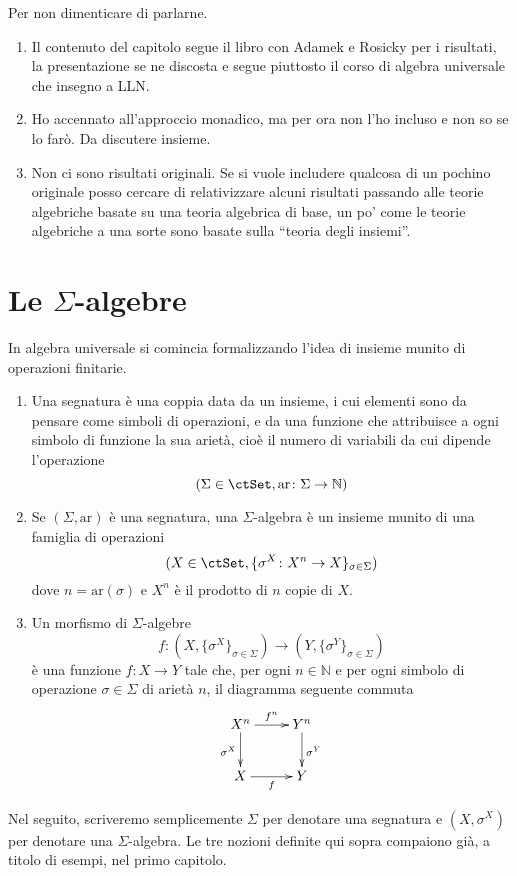 \begin{warning}\label{caveat_monadi_libro_relative}
	Per non dimenticare di parlarne.
	\begin{enumerate}
		\item Il contenuto del capitolo segue il libro con Adamek e Rosicky per i risultati, la presentazione se ne discosta e segue piuttosto il corso di
		      algebra universale che insegno a LLN.
		\item Ho accennato all'approccio monadico, ma per ora non l'ho incluso e non so se lo farò. Da discutere insieme.
		\item Non ci sono risultati originali. Se si vuole includere qualcosa di un pochino originale posso cercare di relativizzare alcuni risultati passando
		      alle teorie algebriche basate su una teoria algebrica di base, un po' come le teorie algebriche a una sorte sono basate sulla ``teoria degli insiemi''.
	\end{enumerate}
\end{warning}

\section{Le \(\Sigma\)-algebre}\label{sec_sigma-alg}

In algebra universale si comincia formalizzando l'idea di insieme munito di operazioni finitarie.

\begin{definition}\label{def_sigma_alg}
	\hfill
	\begin{enumerate}
		\item Una segnatura è una coppia data da un insieme, i cui elementi sono da pensare come simboli di operazioni, e da una funzione che
		      attribuisce a ogni simbolo di funzione la sua arietà, cioè il numero di variabili da cui dipende l'operazione
		      \[
			      (\Sigma \in \ctSet, \mathrm{ar} \colon \Sigma \to \mathbb N)
		      \]
		\item Se \((\Sigma, \mathrm{ar})\) è una segnatura, una \(\Sigma\)-algebra è un insieme munito di una famiglia di operazioni
		      \[
			      (X \in \ctSet, \{\sigma^X \colon X^{n} \to X\}_{\sigma \in \Sigma})
		      \]
		      dove \(n = \mathrm{ar}(\sigma)\) e \(X^n\) è il prodotto di \(n\) copie di \(X\).
		\item Un morfismo di \(\Sigma\)-algebre
		      \[
			      f \colon (X,\{\sigma^X\}_{\sigma \in \Sigma}) \to (Y,\{\sigma^Y\}_{\sigma \in \Sigma})
		      \]
		      è una funzione \(f \colon X \to Y\) tale che, per ogni \(n \in \mathbb N\) e per ogni simbolo di operazione \(\sigma \in \Sigma\) di arietà \(n\),
		      il diagramma seguente commuta
		      \[
			      \xymatrix{ X^{n} \ar[r]^-{f^n} \ar[d]_{\sigma^X} & Y^{n} \ar[d]^{\sigma^Y} \\
			      X \ar[r]_-{f} & Y
			      }
		      \]
	\end{enumerate}
	Nel seguito, scriveremo semplicemente \(\Sigma\) per denotare una segnatura e \((X,\sigma^X)\) per denotare una \(\Sigma\)-algebra.
	Le tre nozioni definite qui sopra compaiono già, a titolo di esempi, nel primo capitolo.
\end{definition}

